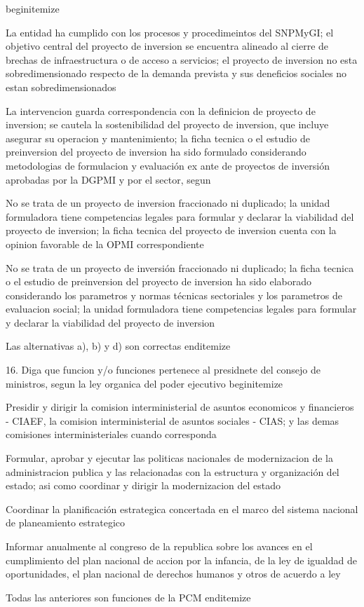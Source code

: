 begin{itemize}
			\item La entidad ha cumplido con los procesos y procedimeintos del SNPMyGI; el objetivo central del proyecto de inversion se encuentra alineado al cierre de brechas de infraestructura o de acceso a servicios; el proyecto de inversion no esta sobredimensionado respecto de la demanda prevista y sus deneficios sociales no estan sobredimensionados
 			\item La intervencion guarda correspondencia con la definicion de proyecto de inversion; se cautela la sostenibilidad del proyecto de inversion, que incluye asegurar su operacion y mantenimiento; la ficha tecnica o el estudio de preinversion del proyecto de inversion ha sido formulado considerando metodologias de formulacion y evaluación ex ante de proyectos de inversión aprobadas por la DGPMI y por el sector, segun  
			\item No se trata de un proyecto de inversion fraccionado ni duplicado; la unidad formuladora tiene competencias legales para formular y declarar la viabilidad del proyecto de inversion; la ficha tecnica del proyecto de inversion cuenta con la opinion favorable de la OPMI correspondiente
			\item No se trata de un proyecto de inversión fraccionado ni duplicado; la ficha tecnica o el estudio de preinversion del proyecto de inversion ha sido elaborado considerando los parametros y normas técnicas sectoriales y los parametros de evaluacion social; la unidad formuladora tiene competencias legales para formular y declarar la viabilidad del proyecto de inversion 
			\item Las alternativas a), b) y d) son correctas
end{itemize}

16. Diga que funcion y/o funciones pertenece al presidnete del consejo de ministros, segun la ley organica del poder ejecutivo
begin{itemize}
			\item Presidir y dirigir la comision interministerial de asuntos economicos y financieros - CIAEF, la comision interministerial de asuntos sociales - CIAS; y las demas comisiones interministeriales cuando corresponda
 			\item Formular, aprobar y ejecutar las politicas nacionales de modernizacion de la administracion publica y las relacionadas con la estructura y organización del estado; asi como coordinar y dirigir la modernizacion del estado
			\item Coordinar la planificación estrategica concertada en el marco del sistema nacional de planeamiento estrategico 
			\item Informar anualmente al congreso de la republica sobre los avances en el cumplimiento del plan nacional de accion por la infancia, de la ley de igualdad de oportunidades, el plan nacional de derechos humanos y otros de acuerdo a ley
			\item Todas las anteriores son funciones de la PCM
end{itemize}


